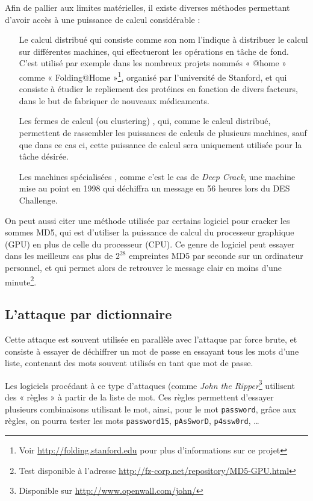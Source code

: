 Afin de pallier aux limites matérielles, il existe diverses
méthodes permettant d'avoir accès à une puissance de
calcul considérable :
\begin{itemize}
  \renewcommand{\makelabel}[1]{\sffamily\textbf{#1}}
  \item[Le calcul distribué] qui consiste comme son nom l'indique
à distribuer le calcul sur différentes machines, qui effectueront
les opérations en tâche de fond. C'est utilisé par exemple dans
les nombreux projets nommés « @home » comme « Folding@Home
»\footnote{Voir \url{http://folding.stanford.edu} pour plus
d'informations sur ce projet},
organisé par l'université de Stanford, et qui consiste à étudier
le repliement des protéines en fonction de divers facteurs, dans
le but de fabriquer de nouveaux médicaments.
  \item[Les fermes de calcul (ou clustering)], qui, comme le
calcul distribué, permettent de rassembler les puissances de
calculs de plusieurs machines, sauf que dans ce cas ci, cette
puissance de calcul sera uniquement utilisée pour la tâche
désirée.
  \item[Les machines spécialisées], comme c'est le cas de
\emph{Deep Crack}, une machine mise au point en 1998 qui déchiffra
un message en 56 heures lors du DES Challenge.\\
\end{itemize}

On peut aussi citer une méthode utilisée par certains logiciel pour
cracker les sommes MD5, qui est d'utiliser la
puissance de calcul du processeur graphique (GPU) en plus de celle
du processeur (CPU). Ce genre de logiciel peut essayer dans les
meilleurs cas plus de
$2^{28}$ empreintes MD5 par seconde sur un ordinateur 
personnel, et qui permet alors de retrouver le message clair en
moins d'une minute\footnote{Test disponible à l'adresse
\url{http://fz-corp.net/repository/MD5-GPU.html}}.

\subsection{L'attaque par dictionnaire}
Cette attaque est souvent utilisée en parallèle avec l'attaque par
force brute, et consiste à essayer de déchiffrer un mot de passe
en essayant tous les mots d'une liste, contenant des mots souvent
utilisés en tant que mot de passe.

Les logiciels procédant à ce type d'attaques (comme \emph{John the
Ripper}\footnote{Disponible sur
\url{http://www.openwall.com/john/}} utilisent des « règles » à
partir de la liste de mot. Ces règles permettent d'essayer
plusieurs combinaisons utilisant le mot, ainsi, pour le mot
\texttt{password}, grâce aux règles, on pourra tester les mots
\texttt{password15}, \texttt{pAsSworD}, \texttt{p4ssw0rd}, \dots

